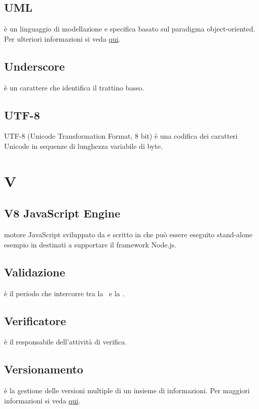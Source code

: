 \documentclass[12pt,a4paper]{article}
\begin{document}
\subsection{UML} 
è un linguaggio di modellazione e specifica basato sul paradigma object-oriented. Per ulteriori informazioni si veda \href{http://it.wikipedia.org/wiki/Unified_Modeling_Language}{qui}.

\subsection{Underscore} 
è un carattere che identifica il trattino basso.

\subsection{UTF-8}
UTF-8 (Unicode Transformation Format, 8 bit) è una codifica dei caratteri Unicode in sequenze di lunghezza variabile di byte.

\newpage

\section{V}


\subsection{V8 JavaScript Engine} 
motore JavaScript  sviluppato da  e scritto in  che  può essere eseguito stand-alone esempio in  destinati a supportare il framework Node.js.

\subsection{Validazione} 
è il periodo che intercorre tra la \RQ\ e la \RA.

\subsection{Verificatore} 
è il responsabile dell'attività di verifica.

\subsection{Versionamento} 
è la gestione delle versioni multiple di un insieme di informazioni. Per maggiori informazioni si veda \href{http://it. wikipedia.org/wiki/Controllo_versione}{qui}.
\end{document}
